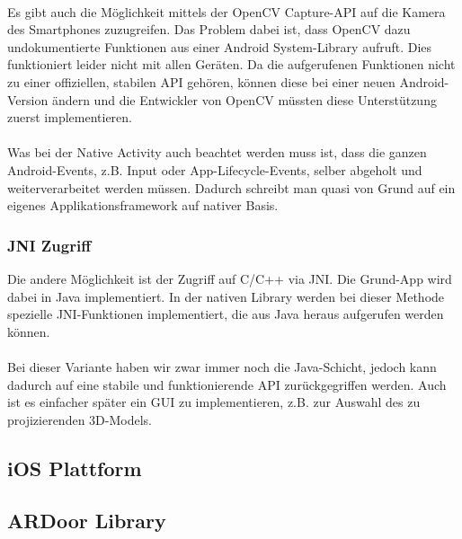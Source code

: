 \documentclass[main.tex]{subfiles}
\begin{document}
\paragraph{}
Es gibt auch die Möglichkeit mittels der OpenCV Capture-API auf die Kamera des Smartphones zuzugreifen. Das Problem dabei ist, dass OpenCV dazu undokumentierte Funktionen aus einer Android System-Library aufruft. Dies funktioniert leider nicht mit allen Geräten. Da die aufgerufenen Funktionen nicht zu einer offiziellen, stabilen API gehören, können diese bei einer neuen Android-Version ändern und die Entwickler von OpenCV müssten diese Unterstützung zuerst implementieren.

\paragraph{}
Was bei der Native Activity auch beachtet werden muss ist, dass die ganzen Android-Events, z.B. Input oder App-Lifecycle-Events, selber abgeholt und weiterverarbeitet werden müssen. Dadurch schreibt man quasi von Grund auf ein eigenes Applikationsframework auf nativer Basis.


\subsubsection{JNI Zugriff}
Die andere Möglichkeit ist der Zugriff auf C/C++ via JNI. Die Grund-App wird dabei in Java implementiert. In der nativen Library werden bei dieser Methode spezielle JNI-Funktionen implementiert, die aus Java heraus aufgerufen werden können.

\paragraph{}
Bei dieser Variante haben wir zwar immer noch die Java-Schicht, jedoch kann dadurch auf eine stabile und funktionierende API zurückgegriffen werden. Auch ist es einfacher später ein GUI zu implementieren, z.B. zur Auswahl des zu projizierenden 3D-Models.


\subsection{iOS Plattform}



\subsection{ARDoor Library}
\end{document}
